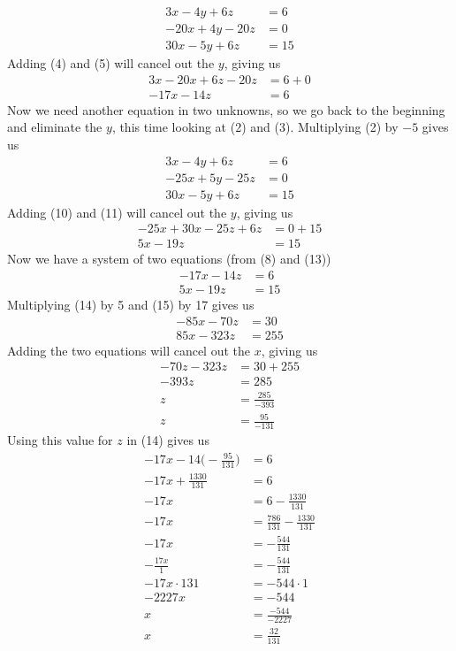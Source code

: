 \documentclass[12pt]{article}
\begin{document}
\begin{align}
3x-4y+6z&=6 \\
-20x+4y-20z&=0 \\
30x-5y+6z&=15
\end{align}
Adding (4) and (5) will cancel out the $y$, giving us
\begin{align}
3x-20x+6z-20z&=6+0 \\
-17x-14z&=6
\end{align}
Now we need another equation in two unknowns, so we go back to the beginning and eliminate the $y$, this time looking at (2) and (3). Multiplying (2) by $-5$ gives us
\begin{align}
3x-4y+6z&=6 \\
-25x+5y-25z&=0 \\
30x-5y+6z&=15
\end{align}
Adding (10) and (11) will cancel out the $y$, giving us
\begin{align}
-25x+30x-25z+6z&=0+15 \\
5x-19z&=15
\end{align}
Now we have a system of two equations (from (8) and (13))
\begin{align}
-17x-14z&=6 \\
5x-19z&=15
\end{align}
Multiplying (14) by 5 and (15) by 17 gives us
\begin{align*}
-85x-70z&=30 \\
85x-323z&=255
\end{align*}
Adding the two equations will cancel out the $x$, giving us
\begin{align*}
-70z-323z&=30+255 \\
-393z&=285 \\
z&=\displaystyle \frac{285}{-393} \\
z&=\displaystyle \frac{95}{-131}
\end{align*}
Using this value for $z$ in (14) gives us
\begin{align*}
-17x-14\bigg(-\displaystyle \frac{95}{131}\bigg)&=6 \\
-17x+\displaystyle \frac{1330}{131}&=6 \\
-17x&=6-\displaystyle \frac{1330}{131} \\
-17x&=\displaystyle \frac{786}{131}-\displaystyle \frac{1330}{131} \\
-17x&=-\displaystyle \frac{544}{131} \\
-\displaystyle \frac{17x}{1}&=-\displaystyle \frac{544}{131} \\
-17x\cdot131&=-544\cdot1 \\
-2227x&=-544 \\
x&=\displaystyle \frac{-544}{-2227} \\
x&=\displaystyle \frac{32}{131}
\end{align*}
\end{document}
